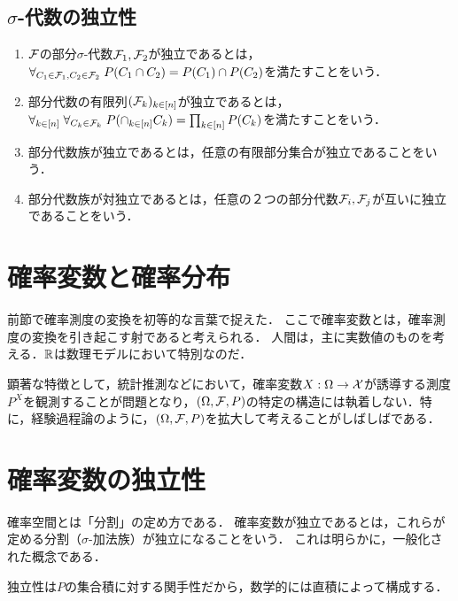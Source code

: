 \documentclass[uplatex,dvipdfmx]{jsreport}
\begin{document}
\subsection{$\sigma$-代数の独立性}

\begin{definition}\mbox{}
    \begin{enumerate}
        \item $\mathcal{F}$の部分$\sigma$-代数$\mathcal{F}_1,\mathcal{F}_2$が独立であるとは，$\forall_{C_1\in\mathcal{F}_1,C_2\in\mathcal{F}_2}\;P(C_1\cap C_2)=P(C_1)\cap P(C_2)$を満たすことをいう．
        \item 部分代数の有限列$(\mathcal{F}_k)_{k\in[n]}$が独立であるとは，$\forall_{k\in[n]}\;\forall_{C_k\in\mathcal{F}_k}\;P(\cap_{k\in[n]}C_k)=\prod_{k\in[n]}P(C_k)$を満たすことをいう．
        \item 部分代数族が独立であるとは，任意の有限部分集合が独立であることをいう．
        \item 部分代数族が対独立であるとは，任意の２つの部分代数$\mathcal{F}_i,\mathcal{F}_j$が互いに独立であることをいう．
    \end{enumerate}
\end{definition}

\section{確率変数と確率分布}

\begin{tcolorbox}[colframe=ForestGreen, colback=ForestGreen!10!white,breakable,colbacktitle=ForestGreen!40!white,coltitle=black,fonttitle=\bfseries\sffamily,
title=]
    前節で確率測度の変換を初等的な言葉で捉えた．
    ここで確率変数とは，確率測度の変換を引き起こす射であると考えられる．
    人間は，主に実数値のものを考える．$\mathbb{R}$は数理モデルにおいて特別なのだ．
\end{tcolorbox}

顕著な特徴として，統計推測などにおいて，確率変数$X:\Omega\to\mathcal{X}$が誘導する測度$P^X$を観測することが問題となり，$(\Omega,\mathcal{F},P)$の特定の構造には執着しない．特に，経験過程論のように，$(\Omega,\mathcal{F},P)$を拡大して考えることがしばしばである．

\section{確率変数の独立性}

\begin{tcolorbox}[colframe=ForestGreen, colback=ForestGreen!10!white,breakable,colbacktitle=ForestGreen!40!white,coltitle=black,fonttitle=\bfseries\sffamily,
title=]
    確率空間とは「分割」の定め方である．
    確率変数が独立であるとは，これらが定める分割（$\sigma$-加法族）が独立になることをいう．
    これは明らかに，一般化された概念である．

    独立性は$P$の集合積に対する関手性だから，数学的には直積によって構成する．
\end{tcolorbox}
\end{document}
